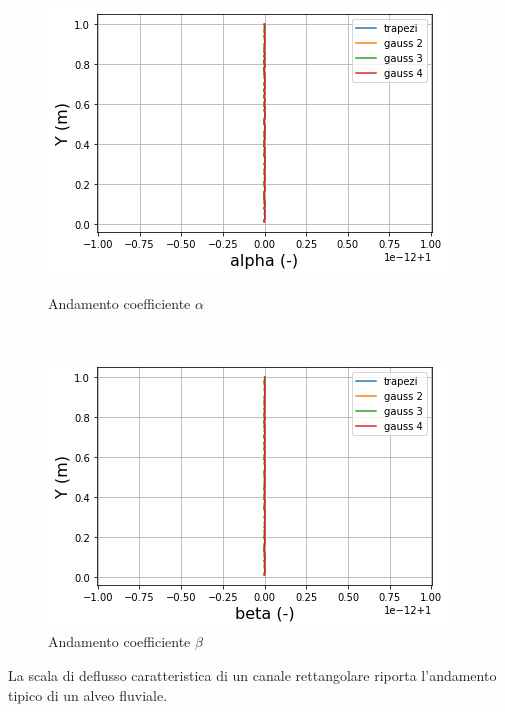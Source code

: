 \documentclass[12pt]{article} %
\begin{document}
\begin{figure}[H]
\begin{minipage}[b]{8.5cm}
\centering
    \includegraphics[width=1 \textwidth]{alpharet.png}
    \caption{Andamento coefficiente $\alpha$}
    \label{fig:rettangolare_alfa}
\end{minipage}
\ \hspace{2mm} \hspace{3mm} \
\begin{minipage}[b]{8.5cm}
    \centering
    \includegraphics[width=1 \textwidth]{betaret.png}
    \caption{Andamento coefficiente $\beta$}
    \label{fig:rettangolare_beta}
\end{minipage}
\end{figure}

\noindent La scala di deflusso caratteristica di un canale rettangolare riporta l'andamento tipico di un alveo fluviale.
\end{document}
